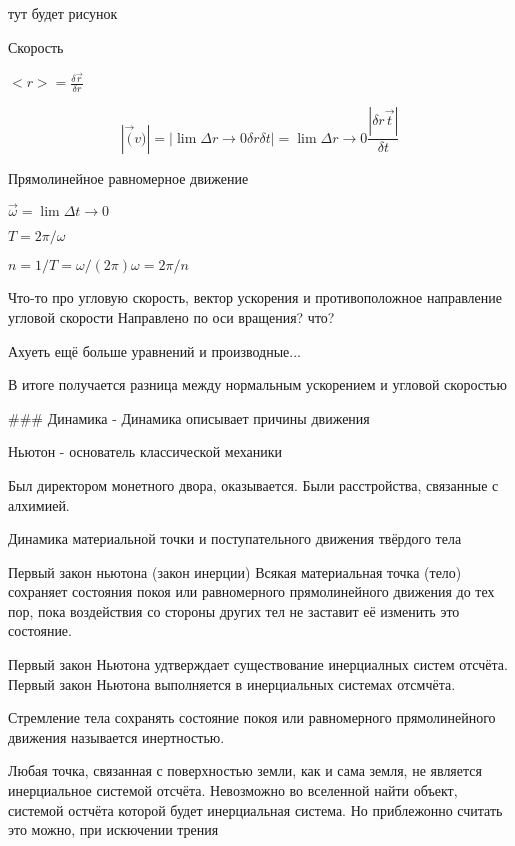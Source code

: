 \documentclass{article}
\begin{document}
    тут будет рисунок

    Скорость 

    $<r> = \frac{\delta \overrightarrow{r}}{\delta r}$
    
    $$ |\overrightarrow(v)|
    = | \lim\limits{\Delta r \to 0} \delta r \delta t | 
    = \lim\limits{\Delta r \to 0} \frac{|\delta r \overrightarrow{t}|}{\delta t}
    $$

    Прямолинейное равномерное движение 
    



    $ 
    \overrightarrow{\omega} = \lim\limits{\Delta t \to 0}
    $

    $
    T = 2\pi/\omega
    $

    $
    n = 1/T = \omega/(2\pi)

    \omega = 2\pi / n
    $

    Что-то про угловую скорость, вектор ускорения и противоположное
    направление угловой скорости
    Направлено по оси вращения? что?

    Ахуеть ещё больше уравнений 
    и производные...

    В итоге получается разница между нормальным ускорением и угловой скоростью
    
    
### Динамика 
- Динамика описывает причины движения

Ньютон - основатель классической механики

Был директором монетного двора, оказывается. Были расстройства, связанные с алхимией. 

Динамика материальной точки и поступательного движения твёрдого тела

Первый закон ньютона (закон инерции)
Всякая материальная точка (тело) сохраняет состояния покоя или равномерного прямолинейного движения до тех пор, пока воздействия со стороны других тел не заставит её изменить это состояние. 

Первый закон Ньютона удтверждает существование инерциалных систем отсчёта.
Первый закон Ньютона выполняется в инерциальных системах отсмчёта.

Стремление тела сохранять состояние покоя или равномерного прямолинейного движения называется инертностью.

Любая точка, связанная с поверхностью земли, как и сама земля, не является инерциальное системой отсчёта.
Невозможно во вселенной найти объект, системой остчёта которой будет инерциальная система. 
Но приблежонно считать это можно, при искючении трения
\end{document}
